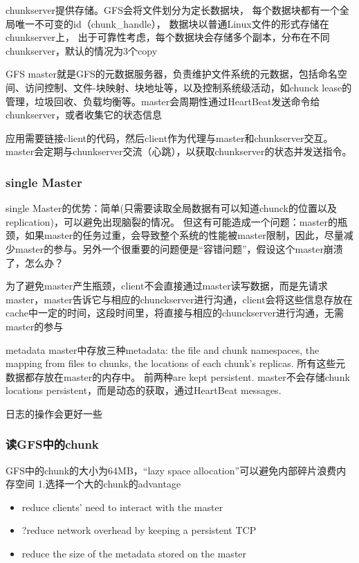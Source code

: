 chunkserver提供存储。GFS会将文件划分为定长数据块，
每个数据块都有一个全局唯一不可变的id（chunk\_handle），
数据块以普通Linux文件的形式存储在chunkserver上，
出于可靠性考虑，每个数据块会存储多个副本，分布在不同chunkserver，默认的情况为3个copy

GFS master就是GFS的元数据服务器，负责维护文件系统的元数据，包括命名空间、访问控制、文件-块映射、块地址等，以及控制系统级活动，如chunck lease的管理，垃圾回收、负载均衡等。master会周期性通过HeartBeat发送命令给chunkserver，或者收集它的状态信息

应用需要链接client的代码，然后client作为代理与master和chunkserver交互。master会定期与chunkserver交流（心跳），以获取chunkserver的状态并发送指令。

\subsubsection{single Master}
single Master的优势：简单(只需要读取全局数据有可以知道chunck的位置以及replication)，可以避免出现脑裂的情况。
但这有可能造成一个问题：master的瓶颈，如果master的任务过重，会导致整个系统的性能被master限制，因此，尽量减少master的参与。另外一个很重要的问题便是“容错问题”，假设这个master崩溃了，怎么办？

为了避免master产生瓶颈，client不会直接通过master读写数据，而是先请求master，master告诉它与相应的chunckserver进行沟通，client会将这些信息存放在cache中一定的时间，这段时间里，将直接与相应的chunckserver进行沟通，无需master的参与

metadata
master中存放三种metadata: the file and chunk namespaces, the mapping from files to chunks, the locations of each chunk's replicas. 所有这些元数据都存放在master的内存中。
前两种are kept persistent.
master不会存储chunk locations persistent，而是动态的获取，通过HeartBeat messages.

{\color{red}日志的操作会更好一些}
\subsubsection{读GFS中的chunk}
GFS中的chunk的大小为64MB，“lazy space allocation”可以避免内部碎片浪费内存空间
1.选择一个大的chunk的advantage
\begin{itemize}
  \item reduce clients' need to interact with the master
  \item ?reduce network overhead by keeping a persistent TCP
  \item reduce the size of the metadata stored on the master 
\end{itemize}


